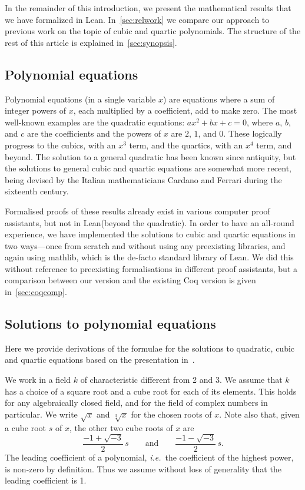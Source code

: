 \documentclass{article} %
\theoremstyle{plain}
\theoremstyle{definition}
\newcommand{\Lean}{\textsf{Lean}\xspace}
\newcommand{\mathlib}{\textsf{mathlib}\xspace}
\begin{document}
In the remainder of this introduction, we present the mathematical results that we have formalized in \Lean. 
In~\cref{sec:relwork} we compare our approach to previous work on the topic of cubic and quartic polynomials.
The structure of the rest of this article is explained in~\cref{sec:synopsis}.

\subsection{Polynomial equations}
\label{sec:intro:poly}

Polynomial equations (in a single variable $x$) are equations where a sum of integer powers of $x$, each multiplied by a coefficient, add to make zero.
The most well-known examples are the quadratic equations:
$ax^2 + bx + c = 0$, where $a$, $b$, and $c$ are the coefficients and the powers of $x$ are $2$, $1$, and $0$.
These logically progress to the cubics, with an $x^3$ term, and the quartics, with an $x^4$ term, and beyond.
The solution to a general quadratic has been known since antiquity, but the solutions to general cubic and quartic equations are somewhat more recent,
being devised by the Italian mathematicians Cardano and Ferrari during the sixteenth century.

Formalised proofs of these results already exist in various computer proof assistants, but not in \Lean (beyond the quadratic).
In order to have an all-round experience,
we have implemented the solutions to cubic and quartic equations
in two ways---once from scratch and without using any preexisting libraries, and again using \mathlib, which is the de-facto standard library of \Lean.
We did this without reference to preexisting formalisations in different proof assistants,
but a comparison between our version and the existing Coq version is given in~\cref{sec:coqcomp}.

\subsection{Solutions to polynomial equations}
\label{sec:intro:mathback}

Here we provide derivations of the formulae for the solutions
to quadratic, cubic and quartic equations based on
the presentation in~\cite{cardano, brookfield_factoring_quartic_polys}.


We work in a field $k$ of characteristic different from 2 and 3.
We assume that $k$ has a choice of a
square root and a cube root for each of its elements.
This holds for any algebraically closed field,
and for the field of complex numbers in particular.
We write $\sqrt{x}$ and $\sqrt[3]{x}$ for the chosen roots of $x$.
Note also that, given a cube root $s$ of $x$,
the other two cube roots of $x$ are
\[
\frac{-1 + \sqrt{-3}}{2}\, s
\qquad \text{and} \qquad
\frac{-1 - \sqrt{-3}}{2}\, s.
\]
%
The leading coefficient of a polynomial,
\textit{i.e.}\ the coefficient of the highest power,
is non-zero by definition.
Thus we assume without loss of generality
that the leading coefficient is 1.
\end{document}
